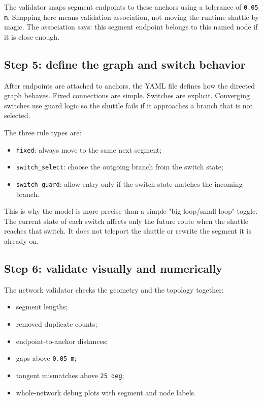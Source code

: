 \documentclass[12pt,a4paper]{report}
\begin{document}
The validator snaps segment endpoints to these anchors using a tolerance of
\texttt{0.05 m}. Snapping here means validation association, not moving the
runtime shuttle by magic. The association says: this segment endpoint belongs to
this named node if it is close enough.

\subsection*{Step 5: define the graph and switch behavior}

After endpoints are attached to anchors, the YAML file defines how the directed
graph behaves. Fixed connections are simple. Switches are explicit. Converging
switches use guard logic so the shuttle fails if it approaches a branch that is
not selected.

The three rule types are:

\begin{itemize}
\item \texttt{fixed}: always move to the same next segment;
\item \texttt{switch\_select}: choose the outgoing branch from the switch state;
\item \texttt{switch\_guard}: allow entry only if the switch state matches the
incoming branch.
\end{itemize}

This is why the model is more precise than a simple "big loop/small loop"
toggle. The current state of each switch affects only the future route when the
shuttle reaches that switch. It does not teleport the shuttle or rewrite the
segment it is already on.

\subsection*{Step 6: validate visually and numerically}

The network validator checks the geometry and the topology together:

\begin{itemize}
\item segment lengths;
\item removed duplicate counts;
\item endpoint-to-anchor distances;
\item gaps above \texttt{0.05 m};
\item tangent mismatches above \texttt{25 deg};
\item whole-network debug plots with segment and node labels.
\end{itemize}
\end{document}
